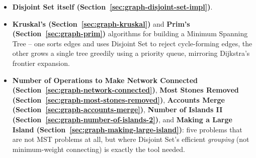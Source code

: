 \begin{patternbox}
\begin{itemize}
  \item \textbf{Disjoint Set itself (Section~\ref{sec:graph-disjoint-set-impl})}.
  \item \textbf{Kruskal's (Section~\ref{sec:graph-kruskal})} and
        \textbf{Prim's (Section~\ref{sec:graph-prim})} algorithms for
        building a Minimum Spanning Tree -- one sorts edges and uses
        Disjoint Set to reject cycle-forming edges, the other grows a
        single tree greedily using a priority queue, mirroring
        Dijkstra's frontier expansion.
  \item \textbf{Number of Operations to Make Network Connected
        (Section~\ref{sec:graph-network-connected})}, \textbf{Most
        Stones Removed (Section~\ref{sec:graph-most-stones-removed})},
        \textbf{Accounts Merge (Section~\ref{sec:graph-accounts-merge})},
        \textbf{Number of Islands II (Section~\ref{sec:graph-number-of-islands-2})},
        and \textbf{Making a Large Island (Section~\ref{sec:graph-making-large-island})}:
        five problems that are not MST problems at all, but where
        Disjoint Set's efficient \emph{grouping} (not minimum-weight
        connecting) is exactly the tool needed.
\end{itemize}
\end{patternbox}

\newpage













